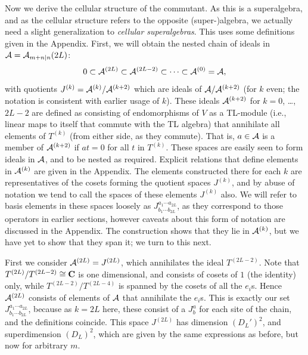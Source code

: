 \documentclass[twocolumn,floats,pra]{revtex4}
\def \cA {{\cal A}}
\newcommand {\be}{\begin{equation}}
\newcommand {\ee} {\end{equation}}
\begin{document}
Now we derive the cellular structure of the commutant. As this is
a superalgebra, and as the cellular structure refers to the
opposite (super-)algebra, we actually need a slight generalization
to {\em cellular superalgebras}. This uses some definitions given
in the Appendix. First, we will obtain the nested chain of ideals
in $\cA=\cA_{m+n|n}(2L)$:%
\be%
0\subset \cA^{(2L)}\subset \cA^{(2L-2)}\subset \cdots \subset
\cA^{(0)}=\cA,\ee%
with quotients $J^{(k)}=\cA^{(k)}/\cA^{(k+2)}$ which are ideals of
$\cA/\cA^{(k+2)}$ (for $k$ even; the notation is consistent with
earlier usage of $k$). These ideals $\cA^{(k+2)}$ for $k=0$,
\ldots, $2L-2$ are defined as consisting of endomorphisms of $V$
as a TL-module (i.e., linear maps to itself that commute with the
TL algebra) that annihilate all elements of $T^{(k)}$ (from either
side, as they commute). That is, $a\in \cA$ is a member of
$\cA^{(k+2)}$ if $at=0$ for all $t$ in $T^{(k)}$. These spaces are
easily seen to form ideals in $\cA$, and to be nested as required.
Explicit relations that define elements in $\cA^{(k)}$ are given
in the Appendix. The elements constructed there for each $k$ are
representatives of the cosets forming the quotient spaces
$J^{(k)}$, and by abuse of notation we tend to call the spaces of
these elements $J^{(k)}$ also. We will refer to basis elements in
these spaces loosely as $J^{a_1\cdots a_{2L}}_{b_1\cdots b_{2L}}$,
as they correspond to those operators in earlier sections, however
caveats about this form of notation are discussed in the Appendix.
The construction shows that they lie in $\cA^{(k)}$, but we have
yet to show that they span it; we turn to this next.

First we consider $\cA^{(2L)}=J^{(2L)}$, which annihilates the
ideal $T^{(2L-2)}$. Note that $T^{(2L)}/T^{(2L-2)}\cong {\bf C}$
is one dimensional, and consists of cosets of $1$ (the identity)
only, while $T^{(2L-2)}/T^{(2L-4)}$ is spanned by the cosets of
all the $e_i$s. Hence $\cA^{(2L)}$ consists of elements of $\cA$
that annihilate the $e_i$s. This is exactly our set $J^{a_1\cdots
a_{2L}}_{b_1\cdots b_{2L}}$, because as $k=2L$ here, these consist
of a $J^a_b$ for each site of the chain, and the definitions
coincide. This space $J^{(2L)}$ has dimension $(D_{L}')^2$, and
superdimension $(D_{L})^2$, which are given by the same
expressions as before, but now for arbitrary $m$.
\end{document}
